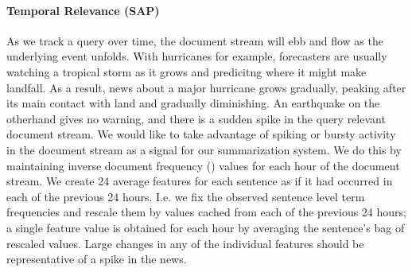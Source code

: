 

\paragraph{Temporal Relevance (SAP)} As we track a query over time, the document
stream will ebb and flow as the underlying event unfolds. With hurricanes
for example, forecasters are usually watching a tropical storm as it grows
and predicitng where it might make landfall. As a result, news about a major
hurricane grows gradually, peaking after its main contact with land
and gradually diminishing. An earthquake on the otherhand gives no warning,
and there is a sudden spike in the query relevant document stream.
We would like to take advantage of spiking or bursty
activity in the document stream as a signal for our summarization system.
We do this by maintaining inverse document frequency (\idf) values for each 
hour of the document stream.
We create 24 average \tfidf{} features for each sentence as if it had occurred
in each of the previous 24 hours. 
I.e. we fix the observed sentence level 
term frequencies
and rescale them by \idf{} values cached from each of the previous 24 hours;
a single feature value is obtained for each hour by averaging the sentence's 
bag of rescaled \tfidf{} values.
 Large changes in any of the individual
features should be representative of a spike in the news.

